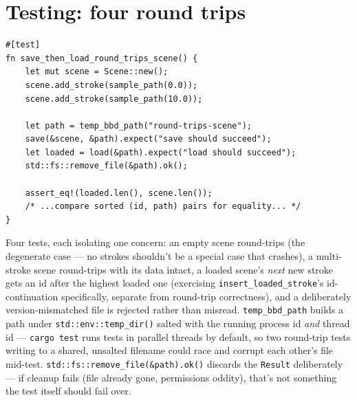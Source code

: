 \documentclass[11pt]{article}
\begin{document}
\section{Testing: four round trips}
\label{sec:testing}
\begin{lstlisting}
#[test]
fn save_then_load_round_trips_scene() {
    let mut scene = Scene::new();
    scene.add_stroke(sample_path(0.0));
    scene.add_stroke(sample_path(10.0));

    let path = temp_bbd_path("round-trips-scene");
    save(&scene, &path).expect("save should succeed");
    let loaded = load(&path).expect("load should succeed");
    std::fs::remove_file(&path).ok();

    assert_eq!(loaded.len(), scene.len());
    /* ...compare sorted (id, path) pairs for equality... */
}
\end{lstlisting}
Four tests, each isolating one concern: an empty scene round-trips (the degenerate case —
no strokes shouldn't be a special case that crashes), a multi-stroke scene round-trips
with its data intact, a loaded scene's \emph{next} new stroke gets an id after the highest
loaded one (exercising \texttt{insert\_loaded\_stroke}'s id-continuation specifically,
separate from round-trip correctness), and a deliberately version-mismatched file is
rejected rather than misread. \texttt{temp\_bbd\_path} builds a path under
\texttt{std::env::temp\_dir()} salted with the running process id \emph{and} thread id —
\texttt{cargo test} runs tests in parallel threads by default, so two round-trip tests
writing to a shared, unsalted filename could race and corrupt each other's file mid-test.
\texttt{std::fs::remove\_file(\&path).ok()} discards the \texttt{Result} deliberately — if
cleanup fails (file already gone, permissions oddity), that's not something the test itself
should fail over.
\end{document}
